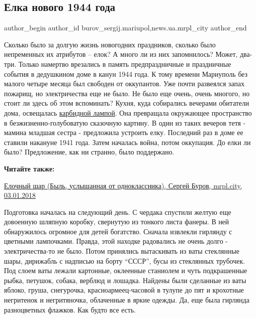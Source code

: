  
 
 
 
 
 
\subsection{Елка нового 1944 года}
\label{sec:29_12_2018.stz.news.ua.mrpl_city.1.jelka_novogo_1944_goda}
 
\ifcmt
 author_begin
   author_id burov_sergij.mariupol,news.ua.mrpl_city
 author_end
\fi


Сколько было за долгую жизнь новогодних праздников, сколько было непременных их
атрибутов – елок? А много ли из них запомнилось? Может, два-три. Только
намертво врезались в память предпраздничные и праздничные события в дедушкином
доме в канун 1944 года. К тому времени Мариуполь без малого четыре месяца был
свободен от оккупантов. Уже почти развеялся запах пожарищ, но электричества еще
не было. Не было еще очень, очень многого, но стоит ли здесь об этом
вспоминать? Кухня, куда собирались вечерами обитатели дома, освещалась
\href{https://archive.org/details/08_12_2018.sergij_burov.mrpl_city.svetilniki}{карбидной
лампой}. Она превращала окружающее пространство в безжизненно-голубоватую
сказочную картину. В один из таких вечеров тетя - мамина младшая сестра -
предложила устроить елку. Последний раз в доме ее ставили накануне 1941 года.
Затем началась война, потом оккупация. До елки ли было? Предложение, как ни
странно, было поддержано.

\textbf{Читайте также:} 

\href{https://archive.org/details/03_01_2018.sergij_burov.mrpl_city.jelochnyj_shar}{%
Елочный шар (Быль, услышанная от одноклассника), Сергей Буров, mrpl.city, 03.01.2018}

Подготовка началась на следующий день. С чердака спустили желтую еще довоенную
шляпную коробку, свернутую из тонкого листа фанеры. В ней обнаружилось огромное
для детей богатство. Сначала извлекли гирлянду с цветными лампочками. Правда,
этой находке радовались не очень долго - электричества-то не было. Потом
принялись вытаскивать из ваты стеклянные шары, дирижабль с надписью на борту
\enquote{СССР}, бусы из стеклянных трубочек. Под слоем ваты лежали картонные, оклеенные
станиолем и чуть подкрашенные рыбка, петушок, собака, верблюд и лошадка.
Найдены были сделанные из ваты яблоко, груша, снегурочка, красноармеец-часовой
в тулупе до пят и крохотные негритенок и негритяночка, облаченные в яркие
одежды. Да, еще была гирлянда разноцветных флажков. Как будто все есть.

